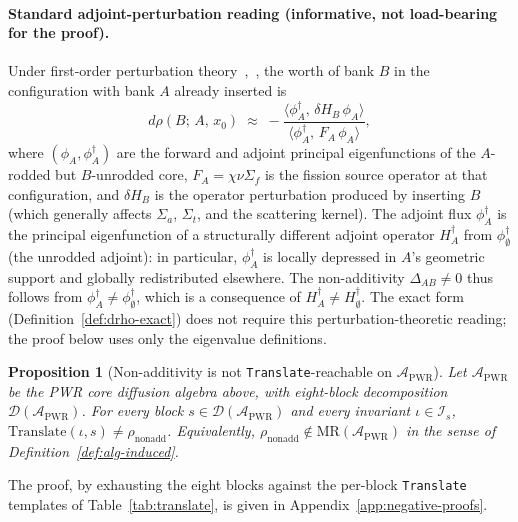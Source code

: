 \documentclass[acmsmall, screen]{acmart}
\newtheorem{proposition}{Proposition}
\begin{document}
\paragraph{Standard adjoint-perturbation reading (informative, not load-bearing for the proof).}
Under first-order perturbation theory~\cite[\S6.3]{BellGlasstone1970},~\cite[\S4.4]{LewisMiller1993}, the worth of bank $B$ in the configuration with bank $A$ already inserted is
\[
d\rho(B;\,A,\,x_{0}) \;\approx\; -\frac{\langle \phi^{\dagger}_{A},\, \delta H_{B}\, \phi_{A}\rangle}{\langle \phi^{\dagger}_{A},\, F_{A}\, \phi_{A}\rangle},
\]
where $(\phi_{A}, \phi^{\dagger}_{A})$ are the forward and adjoint principal eigenfunctions of the $A$-rodded but $B$-unrodded core, $F_{A} = \chi \nu \Sigma_{f}$ is the fission source operator at that configuration, and $\delta H_{B}$ is the operator perturbation produced by inserting $B$ (which generally affects $\Sigma_{a}$, $\Sigma_{t}$, and the scattering kernel). The adjoint flux $\phi^{\dagger}_{A}$ is the principal eigenfunction of a structurally different adjoint operator $H^{\dagger}_{A}$ from $\phi^{\dagger}_{\emptyset}$ (the unrodded adjoint): in particular, $\phi^{\dagger}_{A}$ is locally depressed in $A$'s geometric support and globally redistributed elsewhere. The non-additivity $\Delta_{AB} \neq 0$ thus follows from $\phi^{\dagger}_{A} \neq \phi^{\dagger}_{\emptyset}$, which is a consequence of $H^{\dagger}_{A} \neq H^{\dagger}_{\emptyset}$. The exact form (Definition~\ref{def:drho-exact}) does not require this perturbation-theoretic reading; the proof below uses only the eigenvalue definitions.

\begin{proposition}[Non-additivity is not \texttt{Translate}-reachable on $\mathcal{A}_{\mathrm{PWR}}$]
\label{prop:nonadd}
Let $\mathcal{A}_{\mathrm{PWR}}$ be the PWR core diffusion algebra above, with eight-block decomposition $\mathcal{D}(\mathcal{A}_{\mathrm{PWR}})$. For every block $s \in \mathcal{D}(\mathcal{A}_{\mathrm{PWR}})$ and every invariant $\iota \in \mathcal{I}_{s}$, $\mathrm{Translate}(\iota, s) \neq \rho_{\mathrm{nonadd}}$. Equivalently, $\rho_{\mathrm{nonadd}} \notin \mathrm{MR}(\mathcal{A}_{\mathrm{PWR}})$ in the sense of Definition~\ref{def:alg-induced}.
\end{proposition}

The proof, by exhausting the eight blocks against the per-block \texttt{Translate} templates of Table~\ref{tab:translate}, is given in Appendix~\ref{app:negative-proofs}.
\end{document}
